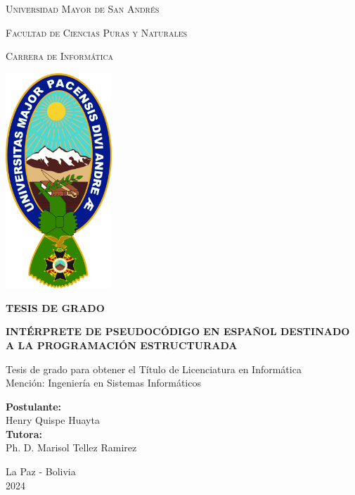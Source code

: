 \begin{titlepage}
  \centering
  {\scshape\LARGE Universidad Mayor de San Andrés \par}
  {\scshape\Large Facultad de Ciencias Puras y Naturales \par}
  {\scshape\Large Carrera de Informática \par}
  \vspace{1cm}
  \includegraphics[width=0.3\textwidth]{images/umsa.png}\par
  \textbf{TESIS DE GRADO}\\
  {\huge\bfseries INTÉRPRETE DE PSEUDOCÓDIGO EN ESPAÑOL DESTINADO A LA PROGRAMACIÓN ESTRUCTURADA \par}
  Tesis de grado para obtener el Título de Licenciatura en Informática\\
  Mención: Ingeniería en Sistemas Informáticos
  \vfill
  \begin{flushleft}
      \textbf{Postulante:}\\
      Henry Quispe Huayta\\
      \textbf{Tutora:}\\
      Ph. D. Marisol Tellez Ramirez
  \end{flushleft}
  \vfill
  {\large La Paz - Bolivia\\ 2024 \par}
\end{titlepage}

